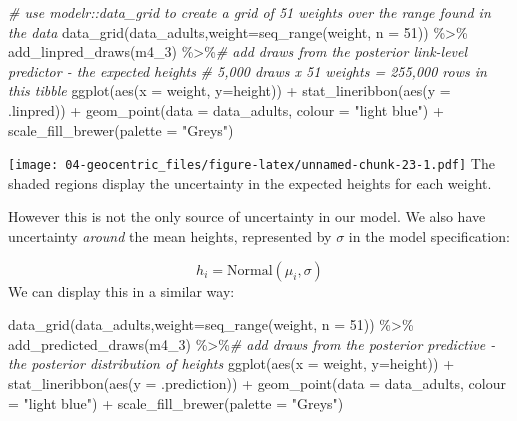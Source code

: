 \documentclass[
]{book}
\newenvironment{Shaded}{\begin{snugshade}}{\end{snugshade}}
\newcommand{\AttributeTok}[1]{\textcolor[rgb]{0.77,0.63,0.00}{#1}}
\newcommand{\CommentTok}[1]{\textcolor[rgb]{0.56,0.35,0.01}{\textit{#1}}}
\newcommand{\DecValTok}[1]{\textcolor[rgb]{0.00,0.00,0.81}{#1}}
\newcommand{\FunctionTok}[1]{\textcolor[rgb]{0.00,0.00,0.00}{#1}}
\newcommand{\NormalTok}[1]{#1}
\newcommand{\SpecialCharTok}[1]{\textcolor[rgb]{0.00,0.00,0.00}{#1}}
\newcommand{\StringTok}[1]{\textcolor[rgb]{0.31,0.60,0.02}{#1}}
\begin{document}
\begin{Shaded}
\begin{Highlighting}[]
\CommentTok{\# use modelr::data\_grid to create a grid of 51 weights over the range found in the data }
\FunctionTok{data\_grid}\NormalTok{(data\_adults,}\AttributeTok{weight=}\FunctionTok{seq\_range}\NormalTok{(weight, }\AttributeTok{n =} \DecValTok{51}\NormalTok{)) }\SpecialCharTok{\%\textgreater{}\%} 
  \FunctionTok{add\_linpred\_draws}\NormalTok{(m4\_3) }\SpecialCharTok{\%\textgreater{}\%}\CommentTok{\# add draws from the posterior link{-}level predictor {-} the expected heights}
\CommentTok{\# 5,000 draws x 51 weights = 255,000 rows in this tibble}
  \FunctionTok{ggplot}\NormalTok{(}\FunctionTok{aes}\NormalTok{(}\AttributeTok{x =}\NormalTok{ weight, }\AttributeTok{y=}\NormalTok{height)) }\SpecialCharTok{+}
  \FunctionTok{stat\_lineribbon}\NormalTok{(}\FunctionTok{aes}\NormalTok{(}\AttributeTok{y =}\NormalTok{ .linpred)) }\SpecialCharTok{+}
  \FunctionTok{geom\_point}\NormalTok{(}\AttributeTok{data =}\NormalTok{ data\_adults, }\AttributeTok{colour =} \StringTok{"light blue"}\NormalTok{) }\SpecialCharTok{+}
  \FunctionTok{scale\_fill\_brewer}\NormalTok{(}\AttributeTok{palette =} \StringTok{"Greys"}\NormalTok{)}
\end{Highlighting}
\end{Shaded}

\texttt{[image: 04-geocentric\_files/figure-latex/unnamed-chunk-23-1.pdf]}
The shaded regions display the uncertainty in the expected heights for each weight.

However this is not the only source of uncertainty in our model. We also have uncertainty \emph{around} the mean heights, represented by \(\sigma\) in the model specification:

\[
h_i = \text{Normal}(\mu_i, \sigma)
\]
We can display this in a similar way:

\begin{Shaded}
\begin{Highlighting}[]
\FunctionTok{data\_grid}\NormalTok{(data\_adults,}\AttributeTok{weight=}\FunctionTok{seq\_range}\NormalTok{(weight, }\AttributeTok{n =} \DecValTok{51}\NormalTok{)) }\SpecialCharTok{\%\textgreater{}\%} 
  \FunctionTok{add\_predicted\_draws}\NormalTok{(m4\_3) }\SpecialCharTok{\%\textgreater{}\%}\CommentTok{\# add draws from the posterior predictive {-} the posterior distribution of heights}
  \FunctionTok{ggplot}\NormalTok{(}\FunctionTok{aes}\NormalTok{(}\AttributeTok{x =}\NormalTok{ weight, }\AttributeTok{y=}\NormalTok{height)) }\SpecialCharTok{+}
  \FunctionTok{stat\_lineribbon}\NormalTok{(}\FunctionTok{aes}\NormalTok{(}\AttributeTok{y =}\NormalTok{ .prediction)) }\SpecialCharTok{+}
  \FunctionTok{geom\_point}\NormalTok{(}\AttributeTok{data =}\NormalTok{ data\_adults, }\AttributeTok{colour =} \StringTok{"light blue"}\NormalTok{) }\SpecialCharTok{+}
  \FunctionTok{scale\_fill\_brewer}\NormalTok{(}\AttributeTok{palette =} \StringTok{"Greys"}\NormalTok{)}
\end{Highlighting}
\end{Shaded}
\end{document}
